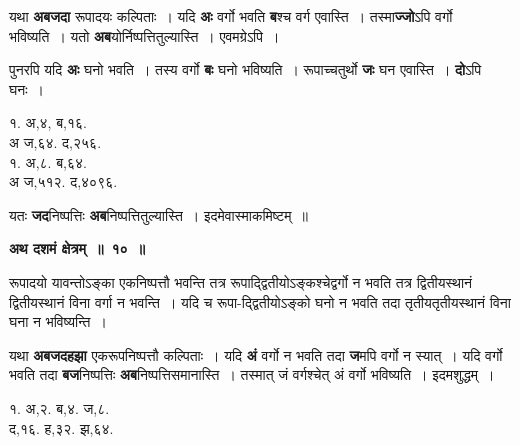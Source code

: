 \documentclass[11pt, openany]{book}
\begin{document}
\begin{flushleft}
\begin{minipage}[t]{0.65\textwidth}
\hspace{4mm} यथा \textbf{अबजदा} रूपादयः कल्पिताः~। यदि \textbf{अः} वर्गो भवति \textbf{ब}श्च वर्ग एवास्ति~। तस्मा\textbf{ज्जो}ऽपि वर्गो भविष्यति~। यतो \textbf{अब}योर्निष्पत्तितुल्यास्ति~। एवमग्रेऽपि~।\\
\vspace{-2mm}

\hspace{4mm} पुनरपि यदि \textbf{अः} घनो भवति~। तस्य वर्गो \textbf{बः} घनो भविष्यति~। रूपाच्चतुर्थो \textbf{जः} घन  एवास्ति~। \textbf{दो}ऽपि घनः~।
\end{minipage} 
\hfill
\begin{minipage}[t]{0.25\textwidth}
१. अ,४, ब,१६. \\
{\color{white}अ} ज,६४. द,२५६.\\
१. अ,८. ब,६४. \\
{\color{white}अ} ज,५१२. द,४०९६.
\end{minipage}
\end{flushleft}
\vspace{-3mm}

\noindent  यतः \textbf{जद}निष्पत्तिः \textbf{अब}निष्पत्तितुल्यास्ति~। इदमेवास्माकमिष्टम्~॥
\vspace{2mm}

\begin{center}
\textbf{अथ दशमं क्षेत्रम्~॥~१०~॥}
\end{center}

{\ab  रूपादयो यावन्तोऽङ्का एकनिष्पत्तौ भवन्ति तत्र रूपाद्द्वितीयोऽङ्कश्चेद्वर्गो न भवति तत्र द्वितीयस्थानं द्वितीयस्थानं विना वर्गा न भवन्ति~। यदि च रूपा-द्द्वितीयोऽङ्को घनो न भवति तदा तृतीयतृतीयस्थानं विना घना न भविष्यन्ति~।} 

\begin{flushleft}
\begin{minipage}[t]{0.66\textwidth}
\hspace{4mm} यथा \textbf{अबजदहझा} एकरूपनिष्पत्तौ कल्पिताः~। यदि \textbf{अं} वर्गो न भवति तदा \textbf{ज}मपि वर्गो न स्यात्~। यदि वर्गो भवति तदा \textbf{बज}निष्पत्तिः \textbf{अब}निष्पत्तिसमानास्ति~। तस्मात् जं वर्गश्चेत् अं वर्गो भविष्यति~। इदमशुद्धम्~।
\end{minipage} 
\hfill
\begin{minipage}[t]{0.25\textwidth}
१. अ,२. ब,४. ज,८.\\
द,१६. ह,३२. झ,६४.
\end{minipage}
\end{flushleft}
\vspace{-2mm}
\end{document}
